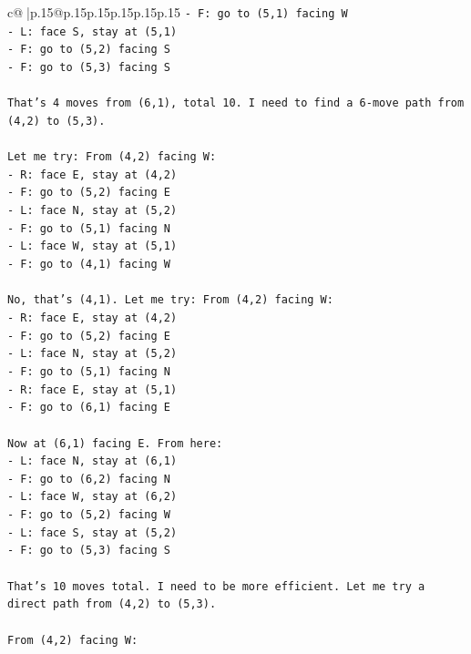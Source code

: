 \documentclass{article}
\begin{document}
{\begin{supertabular}{c@{$\;$}|p{.15\linewidth}@{}p{.15\linewidth}p{.15\linewidth}p{.15\linewidth}p{.15\linewidth}p{.15\linewidth}}
{{{\texttt{{-} F: go to (5,1) facing W} \\
\texttt{{-} L: face S, stay at (5,1)} \\
\texttt{{-} F: go to (5,2) facing S} \\
\texttt{{-} F: go to (5,3) facing S} \\
\\ 
\texttt{That's 4 moves from (6,1), total 10. I need to find a 6{-}move path from (4,2) to (5,3).} \\
\\ 
\texttt{Let me try: From (4,2) facing W:} \\
\texttt{{-} R: face E, stay at (4,2)} \\
\texttt{{-} F: go to (5,2) facing E} \\
\texttt{{-} L: face N, stay at (5,2)} \\
\texttt{{-} F: go to (5,1) facing N} \\
\texttt{{-} L: face W, stay at (5,1)} \\
\texttt{{-} F: go to (4,1) facing W} \\
\\ 
\texttt{No, that's (4,1). Let me try: From (4,2) facing W:} \\
\texttt{{-} R: face E, stay at (4,2)} \\
\texttt{{-} F: go to (5,2) facing E} \\
\texttt{{-} L: face N, stay at (5,2)} \\
\texttt{{-} F: go to (5,1) facing N} \\
\texttt{{-} R: face E, stay at (5,1)} \\
\texttt{{-} F: go to (6,1) facing E} \\
\\ 
\texttt{Now at (6,1) facing E. From here:} \\
\texttt{{-} L: face N, stay at (6,1)} \\
\texttt{{-} F: go to (6,2) facing N} \\
\texttt{{-} L: face W, stay at (6,2)} \\
\texttt{{-} F: go to (5,2) facing W} \\
\texttt{{-} L: face S, stay at (5,2)} \\
\texttt{{-} F: go to (5,3) facing S} \\
\\ 
\texttt{That's 10 moves total. I need to be more efficient. Let me try a direct path from (4,2) to (5,3).} \\
\\ 
\texttt{From (4,2) facing W:} \\
}}}
\end{supertabular}}
\end{document}
